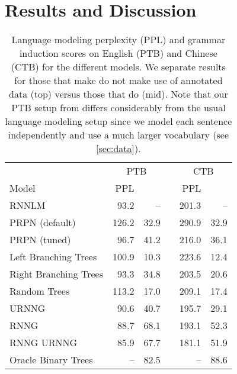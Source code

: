 \documentclass[11pt,a4paper]{article}
\begin{document}
\section{Results and Discussion}\label{sec:results}
\vspace{-2mm}
\begin{table}[t]
\small
    \centering
    \begin{tabular}{l r r r r r}
    \toprule
    & \multicolumn{2}{c}{PTB} & & \multicolumn{2}{c}{CTB} \\
    Model & PPL &  & & PPL &  \\
    \midrule
         RNNLM & 93.2 & -- & & 201.3 & -- \\
         PRPN (default) & 126.2 &32.9 & & 290.9 &32.9 \\
         PRPN (tuned) & 96.7 & 41.2 & & 216.0 & 36.1 \\
Left Branching Trees &100.9 & 10.3  & & 223.6 &12.4  \\
        Right Branching Trees& 93.3 & 34.8  & &203.5  & 20.6 \\
        Random Trees& 113.2 & 17.0 & &209.1 & 17.4 \\
        URNNG & 90.6 & 40.7 & &195.7 & 29.1\\
        \midrule
        RNNG &  88.7 & 68.1 & &193.1 & 52.3 \\
        RNNG  URNNG & 85.9 & 67.7  & & 181.1 & 51.9\\
        \midrule
Oracle Binary Trees & -- & 82.5 & & -- & 88.6 \\
         \bottomrule
    \end{tabular}
    \vspace{-2mm}
    \caption{Language modeling perplexity (PPL) and grammar induction  scores on English (PTB) and Chinese (CTB) for the different models. We separate results for those that make do not make use of annotated data (top) versus those that do (mid). Note that our PTB setup from \citet{dyer2016rnng} differs considerably from the usual language modeling setup \cite{Mikolov2010} since we model each sentence independently and use a much larger vocabulary (see \cref{sec:data}).}
    \label{tab:main}
     \vspace{-2mm}   
\end{table}
\vspace{-1mm}
\end{document}
